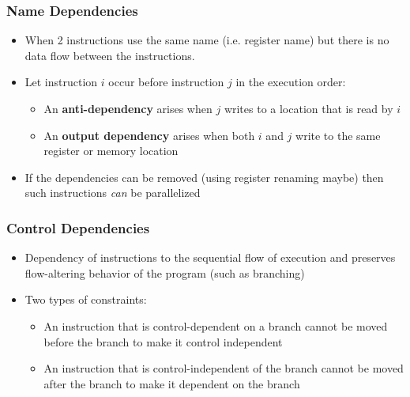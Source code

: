 \documentclass{article}
\begin{document}
\subsubsection{Name Dependencies}
\begin{itemize}
    \item When 2 instructions use the same name (i.e. register name) but there is no data flow between the instructions. 
    
    \item Let instruction $i$ occur before instruction $j$ in the execution order:
    \begin{itemize}
        \item An \textbf{anti-dependency} arises when $j$ writes to a location that is read by $i$
        
        \item An \textbf{output dependency} arises when both $i$ and $j$ write to the same register or memory location
    \end{itemize}
    
    \item If the dependencies can be removed (using register renaming maybe) then such instructions \textit{can} be parallelized
\end{itemize}

\subsubsection{Control Dependencies}
\begin{itemize}
    \item Dependency of instructions to the sequential flow of execution and preserves flow-altering behavior of the program (such as branching)
    
    \item Two types of constraints:
    \begin{itemize}
        \item An instruction that is control-dependent on a branch cannot be moved before the branch to make it control independent
        
        \item An instruction that is control-independent of the branch cannot be moved after the branch to make it dependent on the branch
    \end{itemize}
\end{itemize}
\end{document}
